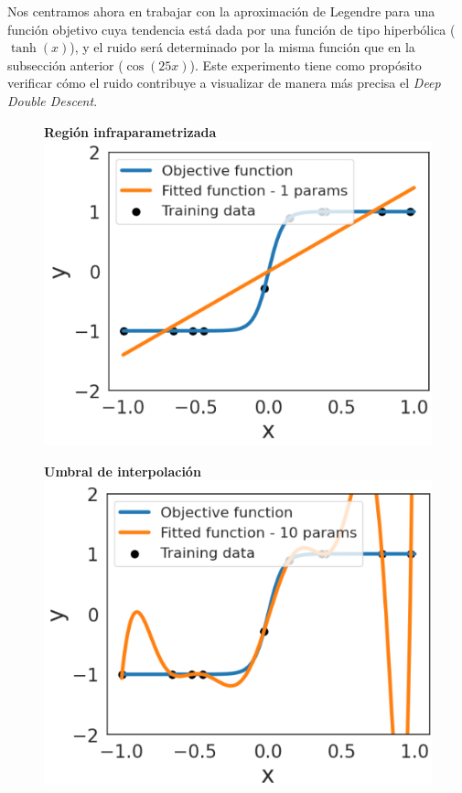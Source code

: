 Nos centramos ahora en trabajar con la aproximación de Legendre para una función objetivo cuya tendencia está dada por una función de tipo hiperbólica ($\tanh(x)$), y el ruido será determinado por la misma función que en la subsección anterior ($\cos(25x)$). Este experimento tiene como propósito verificar cómo el ruido contribuye a visualizar de manera más precisa el \textit{Deep Double Descent}.

\begin{figure}[h]
    \centering
    \begin{minipage}{0.32\textwidth}
        \centering
        \textbf{Región infraparametrizada} \\[0.5ex] 
        \includegraphics[width=\linewidth]{img/experiments/hiperbolica_noiseless1.1.png}
    \end{minipage}
    \begin{minipage}{0.32\textwidth}
        \centering
        \textbf{Umbral de interpolación} \\[0.5ex] 
        \includegraphics[width=\linewidth]{img/experiments/hiperbolica_noiseless1.2.png}

\end{minipage}
\end{figure}
